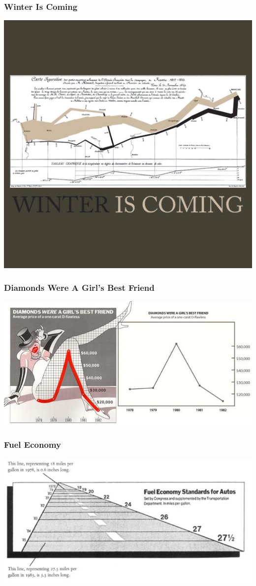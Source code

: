 \documentclass{beamer} %
\begin{document}
\begin{frame}\frametitle{Winter Is Coming}
		\centering
	\includegraphics[width=0.9\linewidth]{winteriscoming.jpg}
\end{frame}


\begin{frame}\frametitle{Diamonds Were A Girl's Best Friend}
		\centering
	\includegraphics[width=\linewidth]{diamonds.jpg}
\end{frame}


\begin{frame}\frametitle{Fuel Economy}
		\centering
	\includegraphics[width=\linewidth]{fuel.jpg}
\end{frame}
\end{document}
